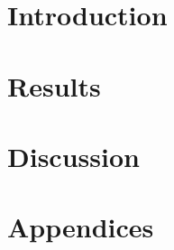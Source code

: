\documentclass[a4paper,oneside,nobind]{thesis}
\begin{document}


\begin{romanpages}
\dominitoc %
\flushbottom
\tableofcontents

\end{romanpages}

\flushbottom


\fancyhf{} %
\pagestyle{fancy}
\renewcommand{\chaptermark}[1]{\markboth{\thechapter. #1}{\thechapter. #1}}
\renewcommand{\sectionmark}[1]{\markright{\thesection. #1}} 
\renewcommand{\headrulewidth}{1pt}
\cfoot{\thepage}
\fancyhead[LO]{\emph{\leftmark}} 
\fancyhead[RE]{\emph{\rightmark}} 

\part{Introduction}
\label{part:intro}





\part{Results}
\label{part:results}

\part{Discussion}
\label{part:discussion}



\cleardoublepage{}
\startappendices
\part*{Appendices}



\end{document}
